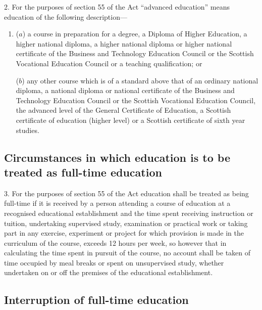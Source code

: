 \documentclass[a4paper,12pt]{article}
\begin{document}
2.  For the purposes of section 55 of the Act “advanced education” means education of the following description—
\begin{enumerate}\item[]
($a$) a course in preparation for a degree, a Diploma of Higher Education, a higher national diploma, a higher national diploma or higher national certificate of the Business and 
Technology %
Education Council or the Scottish Vocational Education Council or a teaching qualification; or

($b$) any other course which is of a standard above that of an ordinary national diploma, a national diploma or national certificate of the Business and 
Technology %
 Education Council or the Scottish Vocational Education Council, the advanced level of the General Certificate of Education, a Scottish certificate of education (higher level) or a Scottish certificate of sixth year studies.
\end{enumerate}


\subsection*{Circumstances in which education is to be treated as full-time education}

3.  For the purposes of section 55 of the Act education shall be treated as being full-time if it is received by a person attending a course of education at a recognised educational establishment and the time spent receiving instruction or tuition, undertaking supervised study, examination or practical work or taking part in any exercise, experiment or project for which provision is made in the curriculum of the course, exceeds 12 hours per week, so however that in calculating the time spent in pursuit of the course, no account shall be taken of time occupied by meal breaks or spent on unsupervised study, whether undertaken on or off the premises of the educational establishment.

\subsection*{Interruption of full-time education}
\end{document}
